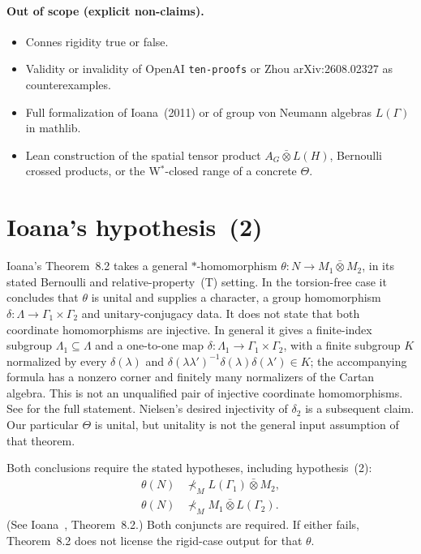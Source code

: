 \documentclass[11pt]{article}
\begin{document}
\paragraph{Out of scope (explicit non-claims).}
\begin{itemize}
\item Connes rigidity true or false.
\item Validity or invalidity of OpenAI \texttt{ten-proofs} or Zhou
  arXiv:2608.02327 as counterexamples.
\item Full formalization of Ioana~(2011) or of group von Neumann algebras
  $L(\Gamma)$ in mathlib.
\item Lean construction of the spatial tensor product $A_G\bar\otimes L(H)$,
  Bernoulli crossed products, or the W$^*$-closed range of a concrete $\Theta$.
\end{itemize}

\section{Ioana's hypothesis~(2)}

Ioana's Theorem~8.2 takes a general $*$-homomorphism
$\theta\colon N\to M_1\bar\otimes M_2$, in its stated Bernoulli and
relative-property~(T) setting. In the torsion-free case it concludes that
$\theta$ is unital and supplies a character, a group homomorphism
$\delta\colon\Lambda\to\Gamma_1\times\Gamma_2$ and unitary-conjugacy data.
It does not state that both coordinate homomorphisms are injective.
In general it gives a finite-index subgroup $\Lambda_1\subseteq\Lambda$
and a one-to-one map $\delta\colon\Lambda_1\to\Gamma_1\times\Gamma_2$,
with a finite subgroup $K$ normalized by every $\delta(\lambda)$ and
$\delta(\lambda\lambda')^{-1}\delta(\lambda)\delta(\lambda')\in K$;
the accompanying formula has a nonzero corner and finitely many
normalizers of the Cartan algebra. This is not an unqualified pair of
injective coordinate homomorphisms. See \cite[Theorem~8.2,
pp.~1207--1208]{Ioana2011} for the full statement. Nielsen's desired
injectivity of $\delta_2$ is a subsequent claim. Our particular $\Theta$ is
unital, but unitality is not the general input assumption of that theorem.

Both conclusions require the stated hypotheses, including hypothesis~(2):
\begin{align*}
\theta(N)&\nprec_M L(\Gamma_1)\bar\otimes M_2,\\
\theta(N)&\nprec_M M_1\bar\otimes L(\Gamma_2).
\end{align*}
(See Ioana~\cite{Ioana2011}, Theorem~8.2.) Both conjuncts are required. If either
fails, Theorem~8.2 does not license the rigid-case output for that $\theta$.
\end{document}
